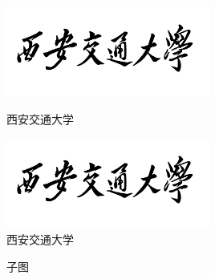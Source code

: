 \documentclass[
    bachelor, 
    ]{xjtuthesis}
\begin{document}
            \begin{figure}[h!]
              \begin{minipage}{0.45\textwidth}
                  \centering
                  \includegraphics[width=6.67cm]{XJTU.pdf}
                  \caption{西安交通大学}
                  \label{fig:xjtu-left}
              \end{minipage}
              \begin{minipage}{0.45\textwidth}
                  \centering
                  \includegraphics[width=6.67cm]{XJTU.pdf}
                  \caption{西安交通大学}
                  \label{fig:xjtu-right}
              \end{minipage}
            \end{figure}
              
            \begin{figure}[h!]
              \centering
              \caption{子图}
            \end{figure}
              
\end{document}
